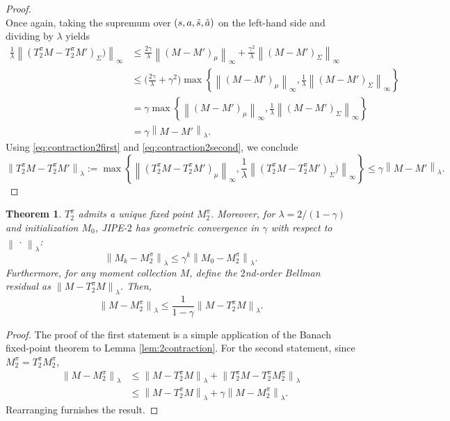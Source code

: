 \documentclass[accepted]{uai2026}
\theoremstyle{plain}
\newtheorem{theorem}{Theorem}[section]
\theoremstyle{definition}
\theoremstyle{remark}
\newcommand{\LVert}{\left\lVert}
\newcommand{\RVert}{\right\rVert}
\newcommand{\1}{\mathbbm{1}}
\newcommand{\norm}[1]{\left\lVert #1\right\rVert}
\begin{document}
\begin{proof}
\begin{equation}
\end{equation}
Once again, taking the supremum over $(s,a, \Tilde{s}, \Tilde{a})$ on the left-hand side and dividing by $\lambda$ yields
\begin{equation}\label{eq:contraction2second}
\begin{split}
\frac{1}{\lambda}\LVert (T^\pi_2 M - T^\pi_2 M')_\Sigma)\RVert_\infty &\le \frac{2\gamma}{\lambda} \LVert (M-M')_\mu\RVert_\infty + \frac{\gamma^2}{\lambda} \LVert (M-M')_\Sigma \RVert_\infty \\
&\le \big(\frac{2\gamma}{\lambda} + \gamma^2 \big)\max \left\{ \LVert (M-M')_\mu\RVert_\infty, \frac{1}{\lambda}\LVert (M-M')_\Sigma\RVert_\infty\right\} \\
&=\gamma  \max \left\{ \LVert (M-M')_\mu\RVert_\infty, \frac{1}{\lambda}\LVert (M-M')_\Sigma\RVert_\infty\right\} \\
&= \gamma \LVert M-M'\RVert_{\lambda}.
\end{split}
\end{equation}
Using \eqref{eq:contraction2first} and \eqref{eq:contraction2second}, we conclude
\begin{equation}
\LVert T^\pi_2 M - T^\pi_2 M'\RVert_{\lambda} := \max\left\{\LVert (T^\pi_2M - T^\pi_2M')_\mu\RVert_\infty,  \frac{1}{\lambda}\LVert (T^\pi_2 M - T^\pi_2 M')_\Sigma)\RVert_\infty\right\} \le \gamma \LVert M-M'\RVert_{\lambda}.
\end{equation}
\end{proof}
\begin{theorem}
$T^\pi_2$ admits a unique fixed point $M^\pi_2$. Moreover, for $\lambda = 2/(1-\gamma)$ and initialization $M_0$, JIPE-$2$ has geometric convergence in $\gamma$ with respect to $\norm{\,\cdot\,}_{\lambda}$:
\begin{equation}
\LVert M_k - M^\pi_2\RVert_{\lambda} \le \gamma^k\LVert M_0 - M^{\pi}_2 \RVert_{\lambda}.
\end{equation}
Furthermore, for any moment collection $M$, define the $2$nd-order Bellman residual as $\LVert M - T^\pi_2 M\RVert_{\lambda}$.
Then,
\begin{equation}
\LVert M - M^\pi_2 \RVert_{\lambda} \le \frac{1}{1-\gamma}\LVert M - T^\pi_2 M\RVert_{\lambda}.
\end{equation}
\end{theorem}
\begin{proof}
The proof of the first statement is a simple application of the Banach fixed-point theorem to Lemma \ref{lem:2contraction}. For the second statement, since $M^\pi_2 = T^\pi_2 M^\pi_2$,
\begin{equation}
\begin{split}
\LVert M - M^\pi_2 \RVert_{\lambda} &\le \LVert M - T^\pi_2 M\RVert_{\lambda} + \LVert T^\pi_2 M - T^\pi_2 M^\pi_2\RVert_{\lambda} \\
&\le \LVert M - T^\pi_2 M\RVert_{\lambda} + \gamma \LVert M - M^\pi_2\RVert_{\lambda}.
\end{split}
\end{equation}
Rearranging furnishes the result.
\end{proof}
\end{document}
